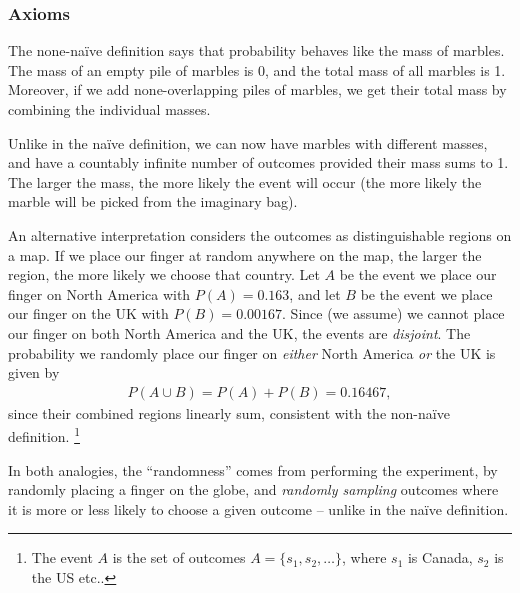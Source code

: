 \documentclass[11pt,a4paper]{article}
\begin{document}
\subsubsection{Axioms}

The none-naïve definition says that probability 
behaves like the mass of marbles. 
The mass of an empty pile of marbles is 0,
and the total mass of all marbles is 1. 
Moreover, 
if we add none-overlapping piles of marbles, 
we get their total mass by combining the individual masses. 

Unlike in the naïve definition, 
we can now have marbles with different masses, 
and have a countably infinite number of outcomes provided their mass sums to 1.
The larger the mass, 
the more likely the event will occur (the more likely the 
marble will be picked from the imaginary bag). 

An alternative interpretation considers the outcomes 
as distinguishable regions on a map. 
If we place our finger at random anywhere on the map, 
the larger the region, 
the more likely we choose that country.
Let \(A\) be the event we place our finger on 
North America with \(P(A)=0.163\),
and let \(B\) be the event we place our finger on 
the UK with \(P(B) = 0.00167\).
Since (we assume) we cannot place our 
finger on both North America and the UK, 
the events are \emph{disjoint}.
The probability we randomly place our finger on \emph{either} 
North America \emph{or} the UK is given by
\begin{align}
P(A \cup B) = P(A) + P(B) = 0.16467,
\end{align}
since their combined regions linearly sum,
consistent with the non-naïve definition.%
\footnote{%
The event \(A\) is the set of outcomes \(A = \{s_1, s_2, \ldots\}\), 
where \(s_1\) is Canada, 
\(s_2\) is the US etc..
}

In both analogies, 
the ``randomness'' comes from performing the experiment, 
by randomly placing a finger on the globe, 
and \emph{randomly sampling} outcomes where it is more or less likely to choose a given outcome -- unlike in the naïve definition.
\end{document}
